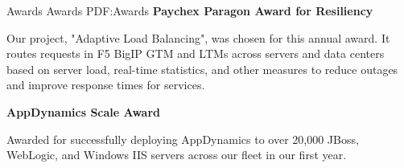 \documentclass[MMMMyyyy,nonstopmode]{simpleresumecv_stacked}
\newcommand{\CVNote}{Resume created {\today} in \LaTeX. See it at \href{https://github.com/edgriebel/resume-cv}{\underline{github.com/edgriebel}}}
\begin{document}
\begin{Body}
\Section
{Awards}
{Awards}
{PDF:Awards}
\textbf{Paychex Paragon Award for Resiliency}
\hfill
{}
\begin{Detail}
Our project, "Adaptive Load Balancing", was chosen for this annual award. 
It routes requests in F5 BigIP GTM and LTMs across servers and data centers based on server load, real-time statistics, and other measures to reduce outages and improve response times for services.
\end{Detail}
\BigGap

\textbf{AppDynamics Scale Award}
\hfill

Awarded for successfully deploying AppDynamics to over 20,000 JBoss, WebLogic, and Windows IIS servers across our fleet in our first year.
\fi %


\iffalse
\Section
{Publications}
{Publications}
{PDF:Publications}

\SubSection
{Technical Editor}
{Technical Editor}
{PDF:TechnicalEditor}

\Entry
\href{https://www.amazon.com/Oracle-Certified-Associate-ProgrammerStudy/dp/1849687323}
{Reece, Richard M. \textit{Oracle Certified Associate, Java SE 7 Programmer Study Guide}, Packt Publishing, 2012}

\Gap
\Entry
\href
{https://www.amazon.com/Java-Concurrency-Cookbook-FernandezJavier/dp/1849687889}
{Gonzalez, Javier Fernandez. \textit{Java 7 Concurrency Cookbook}, Packt Publishing, 2012}
\fi



\iffalse
  \Gap
  \begin{center}
    [\textit{\CVNote}]
  \end{center}
\fi
  
\end{Body}


\end{document}
